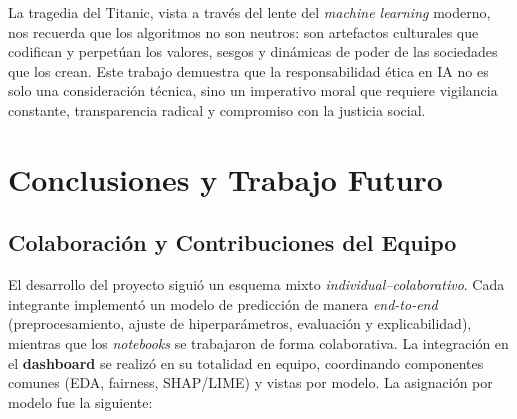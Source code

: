 \documentclass[conference]{IEEEtran}
\begin{document}
La tragedia del Titanic, vista a través del lente del \emph{machine learning} moderno, nos recuerda que los algoritmos no son neutros: son artefactos culturales que codifican y perpetúan los valores, sesgos y dinámicas de poder de las sociedades que los crean. Este trabajo demuestra que la responsabilidad ética en IA no es solo una consideración técnica, sino un imperativo moral que requiere vigilancia constante, transparencia radical y compromiso con la justicia social.


\section{Conclusiones y Trabajo Futuro}

\subsection{Colaboración y Contribuciones del Equipo}

El desarrollo del proyecto siguió un esquema mixto \emph{individual–colaborativo}. Cada integrante implementó un modelo de predicción de manera \emph{end-to-end} (preprocesamiento, ajuste de hiperparámetros, evaluación y explicabilidad), mientras que los \emph{notebooks} se trabajaron de forma colaborativa. La integración en el \textbf{dashboard} se realizó en su totalidad en equipo, coordinando componentes comunes (EDA, fairness, SHAP/LIME) y vistas por modelo. La asignación por modelo fue la siguiente:
\end{document}
